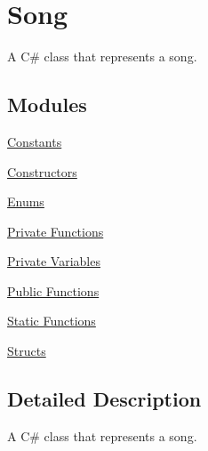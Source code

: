 \hypertarget{group___doc_song}{}\section{Song}
\label{group___doc_song}


A C\# class that represents a song.  


\subsection*{Modules}
\begin{DoxyCompactItemize}
\item 
\hyperlink{group___song_const}{Constants}
\item 
\hyperlink{group___song_construct}{Constructors}
\item 
\hyperlink{group___song_enums}{Enums}
\item 
\hyperlink{group___song_priv_func}{Private Functions}
\item 
\hyperlink{group___song_priv_var}{Private Variables}
\item 
\hyperlink{group___song_pub_func}{Public Functions}
\item 
\hyperlink{group___song_stat_func}{Static Functions}
\item 
\hyperlink{group___song_structs}{Structs}
\end{DoxyCompactItemize}


\subsection{Detailed Description}
A C\# class that represents a song. 

